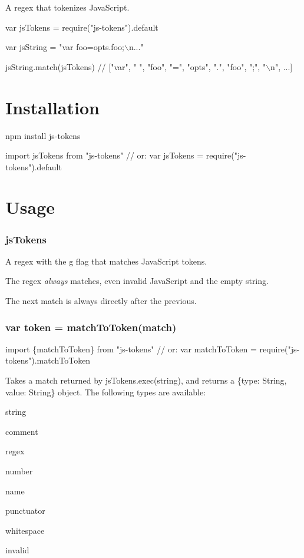 A regex that tokenizes Java\+Script.


\begin{DoxyCode}
var jsTokens = require("js-tokens").default

var jsString = "var foo=opts.foo;\(\backslash\)n..."

jsString.match(jsTokens)
// ["var", " ", "foo", "=", "opts", ".", "foo", ";", "\(\backslash\)n", ...]
\end{DoxyCode}


\section*{Installation }

{\ttfamily npm install js-\/tokens}


\begin{DoxyCode}
import jsTokens from "js-tokens"
// or:
var jsTokens = require("js-tokens").default
\end{DoxyCode}


\section*{Usage }

\subsubsection*{{\ttfamily js\+Tokens}}

A regex with the {\ttfamily g} flag that matches Java\+Script tokens.

The regex {\itshape always} matches, even invalid Java\+Script and the empty string.

The next match is always directly after the previous.

\subsubsection*{{\ttfamily var token = match\+To\+Token(match)}}


\begin{DoxyCode}
import \{matchToToken\} from "js-tokens"
// or:
var matchToToken = require("js-tokens").matchToToken
\end{DoxyCode}


Takes a {\ttfamily match} returned by {\ttfamily js\+Tokens.\+exec(string)}, and returns a {\ttfamily \{type\+: String, value\+: String\}} object. The following types are available\+:


\begin{DoxyItemize}
\item string
\item comment
\item regex
\item number
\item name
\item punctuator
\item whitespace
\item invalid
\end{DoxyItemize}

